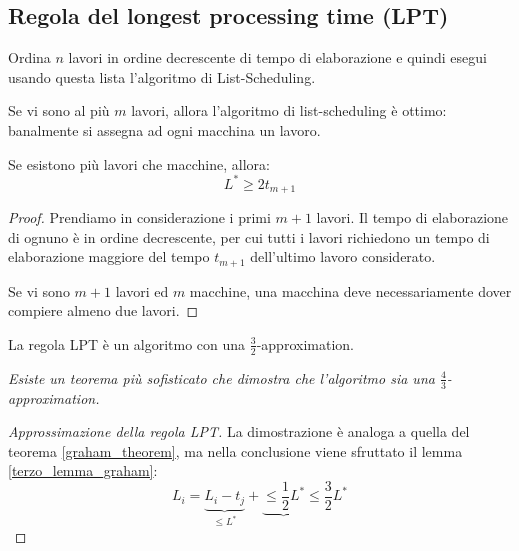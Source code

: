 \documentclass[\main/main.tex]{subfiles}
\begin{document}
\subsection{Regola del longest processing time (LPT)}
Ordina \(n\) lavori in ordine decrescente di tempo di elaborazione e quindi esegui usando questa lista l'algoritmo di List-Scheduling.

\begin{observation}
  Se vi sono al più \(m\) lavori, allora l'algoritmo di list-scheduling è ottimo: banalmente si assegna ad ogni macchina un lavoro.
\end{observation}

\begin{lemma}
  Se esistono più lavori che macchine, allora:
  \[
    L^* \geq 2t_{m+1}
  \]
  \label{terzo_lemma_graham}
\end{lemma}
\begin{proof}
  Prendiamo in considerazione i primi \(m+1\) lavori. Il tempo di elaborazione di ognuno è in ordine decrescente, per cui tutti i lavori richiedono un tempo di elaborazione maggiore del tempo \(t_{m+1}\) dell'ultimo lavoro considerato.

  Se vi sono \(m+1\) lavori ed \(m\) macchine, una macchina deve necessariamente dover compiere almeno due lavori.
\end{proof}

\begin{theorem}
  La regola LPT è un algoritmo con una \(\frac{3}{2}\)-approximation.

  \textit{Esiste un teorema più sofisticato che dimostra che l'algoritmo sia una \(\frac{4}{3}\)-approximation.}
\end{theorem}
\begin{proof}[Approssimazione della regola LPT]
  La dimostrazione è analoga a quella del teorema \ref{graham_theorem}, ma nella conclusione viene sfruttato il lemma \ref{terzo_lemma_graham}:
  \[
    L_i = \underbrace{L_i - t_j}_{\leq L^*} + \underbrace{\leq \frac{1}{2}L^*} \leq \frac{3}{2} L^*
  \]
\end{proof}
\end{document}
